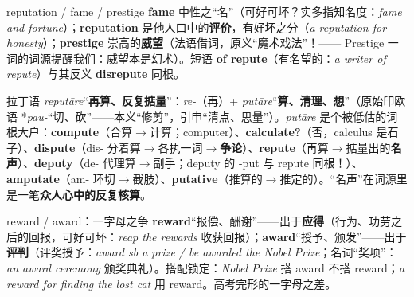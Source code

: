 \documentclass[../main.tex]{subfiles}
\begin{document}

\begin{gram}{reputation / fame / prestige}
\textbf{fame} 中性之“名”（可好可坏？实多指知名度：\textit{fame and fortune}）；\textbf{reputation} 是他人口中的\textbf{评价}，有好坏之分（\textit{a reputation for honesty}）；\textbf{prestige} 崇高的\textbf{威望}（法语借词，原义“魔术戏法”！—— Prestige 一词的词源提醒我们：威望本是幻术）。短语 \textbf{of repute}（有名望的：\textit{a writer of repute}）与其反义 \textbf{disrepute} 同根。
\end{gram}

\begin{origin}
拉丁语 \textit{reputāre}“\textbf{再算、反复掂量}”：\textit{re-}（再）+ \textit{putāre}“\textbf{算、清理、想}”（原始印欧语 *\textit{pau-}“切、砍”——本义“修剪”，引申“清点、思量”）。\textit{putāre} 是个被低估的词根大户：\textbf{compute}（合算$\to$计算；computer）、\textbf{calculate?}（否，calculus 是石子）、\textbf{dispute}（dis- 分着算$\to$各执一词$\to$\textbf{争论}）、\textbf{repute}（再算$\to$掂量出的\textbf{名声}）、\textbf{deputy}（de- 代理算$\to$副手；deputy 的 -put 与 repute 同根！）、\textbf{amputate}（am- 环切$\to$截肢）、\textbf{putative}（推算的$\to$推定的）。“名声”在词源里是一笔\textbf{众人心中的反复核算}。
\end{origin}




\begin{gram}{reward / award：一字母之争}
\textbf{reward}“报偿、酬谢”——出于\textbf{应得}（行为、功劳之后的回报，可好可坏：\textit{reap the rewards} 收获回报）；\textbf{award}“授予、颁发”——出于\textbf{评判}（评奖授予：\textit{award sb a prize / be awarded the Nobel Prize}；名词“奖项”：\textit{an award ceremony} 颁奖典礼）。搭配锁定：\textit{Nobel Prize} 搭 award 不搭 reward；\textit{a reward for finding the lost cat} 用 reward。高考完形的一字母之差。
\end{gram}
\end{document}
